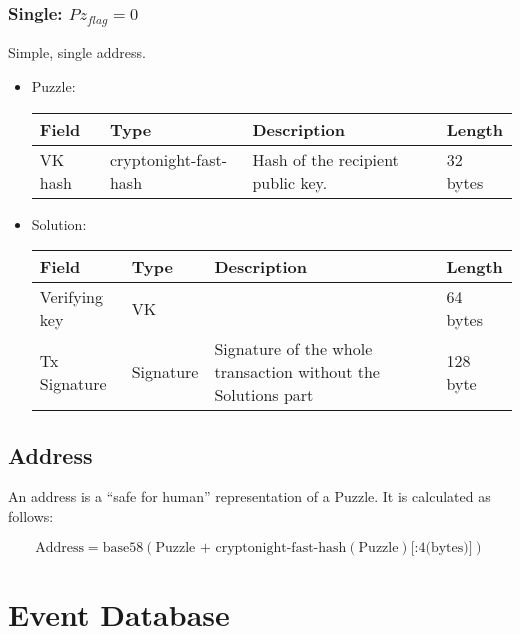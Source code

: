 \documentclass[a4paper,10pt]{article}
\begin{document}
            \subsubsection{Single: ${Pz}_{flag} = 0$}
                Simple, single address.
                \begin{itemize}
                 \item Puzzle:\\
                    
                    \begin{tabularx}{\textwidth}{|l|l|X|l|}
                        \hline Field & Type & Description & Length \\ \hline
                        \hline VK hash & cryptonight-fast-hash & Hash of the recipient public key. & 32 bytes \\
                        \hline
                    \end{tabularx}
                 \item Solution:\\
                 
                    \begin{tabularx}{\textwidth}{|l|l|X|l|}
                        \hline Field & Type & Description & Length \\ \hline
                        \hline Verifying key & VK &  & 64 bytes \\
                        \hline Tx Signature & Signature & Signature of the whole transaction without the Solutions part & 128 byte \\
                        \hline
                    \end{tabularx}
                \end{itemize}
        
        \subsection{Address}
            An address is a ``safe for human'' representation of a Puzzle.
            It is calculated as follows:
            
            $$\text{Address} = \text{base58}(\text{Puzzle + cryptonight-fast-hash}(\text{Puzzle})\text{[:4(bytes)]})$$

                
    \section{Event Database}
\end{document}
